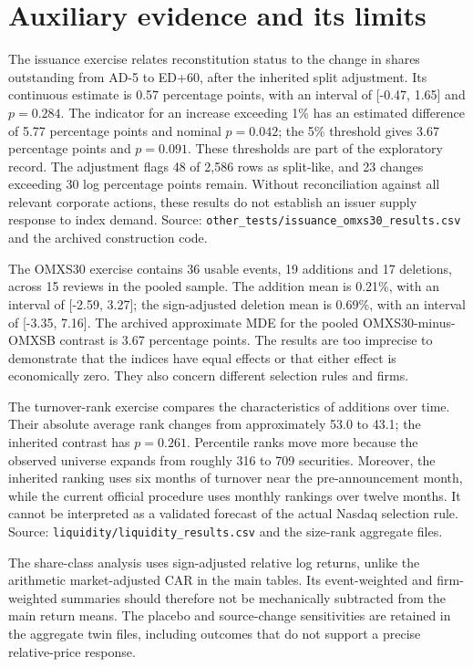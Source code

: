 \section{Auxiliary evidence and its limits}
\label{app:auxiliary}

The issuance exercise relates reconstitution status to the change in shares outstanding from AD-5 to ED+60, after the inherited split adjustment. Its continuous estimate is 0.57 percentage points, with an interval of [-0.47, 1.65] and $p=0.284$. The indicator for an increase exceeding 1\% has an estimated difference of 5.77 percentage points and nominal $p=0.042$; the 5\% threshold gives 3.67 percentage points and $p=0.091$. These thresholds are part of the exploratory record. The adjustment flags 48 of 2,586 rows as split-like, and 23 changes exceeding 30 log percentage points remain. Without reconciliation against all relevant corporate actions, these results do not establish an issuer supply response to index demand. Source: \texttt{other\_tests/issuance\_omxs30\_results.csv} and the archived construction code.

The OMXS30 exercise contains 36 usable events, 19 additions and 17 deletions, across 15 reviews in the pooled sample. The addition mean is 0.21\%, with an interval of [-2.59, 3.27]; the sign-adjusted deletion mean is 0.69\%, with an interval of [-3.35, 7.16]. The archived approximate MDE for the pooled OMXS30-minus-OMXSB contrast is 3.67 percentage points. The results are too imprecise to demonstrate that the indices have equal effects or that either effect is economically zero. They also concern different selection rules and firms.

The turnover-rank exercise compares the characteristics of additions over time. Their absolute average rank changes from approximately 53.0 to 43.1; the inherited contrast has $p=0.261$. Percentile ranks move more because the observed universe expands from roughly 316 to 709 securities. Moreover, the inherited ranking uses six months of turnover near the pre-announcement month, while the current official procedure uses monthly rankings over twelve months. It cannot be interpreted as a validated forecast of the actual Nasdaq selection rule. Source: \texttt{liquidity/liquidity\_results.csv} and the size-rank aggregate files.

The share-class analysis uses sign-adjusted relative log returns, unlike the arithmetic market-adjusted CAR in the main tables. Its event-weighted and firm-weighted summaries should therefore not be mechanically subtracted from the main return means. The placebo and source-change sensitivities are retained in the aggregate twin files, including outcomes that do not support a precise relative-price response.

